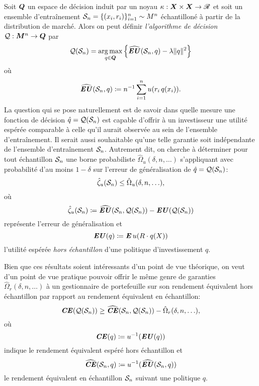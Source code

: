 Soit $\Q$ un espace de décision induit par un noyau $\kappa : \X \times \X \to \Re$ et soit un ensemble
d'entraînement $\S_n = \{(x_i,r_i)\}_{i=1}^n \sim M^n$ échantilloné à partir de la
distribution de marché. Alors on peut définir \textit{l'algorithme de décision}
$\alg:\M^n \to \Q$ par
\begin{equation}
  \label{b:basic}
  \alg(\S_n) = \argmax_{q \in \Q} \left\{\hEU(\S_n,q) - \lambda\nq{q}^2\right\}
\end{equation}
où
\begin{equation}
  \hEU(\S_n,q) \coloneqq n^{-1}\sumi u(r_i\,q(x_i)).
\end{equation}
La question qui se pose naturellement est de savoir dans quelle mesure une fonction de
décision $\hat q = \alg(\S_n)$ est capable d'offrir à un investisseur une utilité espérée
comparable à celle qu'il aurait observée au sein de l'ensemble d'entraînement. Il serait
aussi souhaitable qu'une telle garantie soit indépendante de l'ensemble d'entraînement
$\S_n$. Autrement dit, on cherche à déterminer pour tout échantillon $\S_n$ une borne
probabiliste $\hat\Omega_u(\delta,n,\ldots)$ s'appliquant avec probabilité d'au moins
$1-\delta$ sur l'erreur de généralisation de $\hat q = \alg(\S_n)$:
\begin{equation}
  \hat\zeta_u(\S_n) \leq \hat\Omega_u(\delta,n,\ldots),
\end{equation}
où
\begin{equation}
  \label{b:zeta}
  \hat\zeta_u(\S_n) \coloneqq \hEU(\S_n,\alg(\S_n)) - \EU(\alg(\S_n))
\end{equation}
représente l'erreur de généralisation et
\begin{equation}
  \EU(q) \coloneq \E u(R\cdot q(X))
\end{equation}
l'utilité espérée \textit{hors échantillon} d'une politique d'investissement $q$.

Bien que ces résultats soient intéressants d'un point de vue théorique, on veut d'un point
de vue pratique pouvoir offrir le même genre de garanties $\hat\Omega_r(\delta,n,\ldots)$ à un
gestionnaire de portefeuille sur son rendement équivalent hors échantillon par rapport au
rendement équivalent en échantillon:
\begin{equation}
  \CE(\alg(\S_n)) \geq \hCE(\S_n,\alg(\S_n)) - \hat\Omega_r(\delta,n,\ldots),
\end{equation}
où
\begin{equation}
  \CE(q) \coloneq u^{-1}(\EU(q))
\end{equation}
indique le rendement équivalent espéré hors échantillon et
\begin{equation}
  \hCE(\S_n,q) \coloneq u^{-1}(\hEU(\S_n,q))
\end{equation}
le rendement équivalent en échantillon $\S_n$ suivant une politique $q$. 


